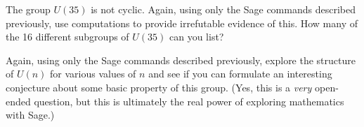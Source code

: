 \begin{sageverbatim}\end{sageverbatim}
%
%
The group $U(35)$ is not cyclic.  Again, using only the Sage commands described previously, use computations to provide irrefutable evidence of this.  How many of the 16 different subgroups of $U(35)$ can you list?\par
\begin{sageverbatim}\end{sageverbatim}
%
%
Again, using only the Sage commands described previously, explore the structure of $U(n)$ for various values of $n$ and see if you can formulate an interesting conjecture about some basic property of this group.  (Yes, this is a {\em very} open-ended question, but this is ultimately the real power of exploring mathematics with Sage.)
\begin{sageverbatim}\end{sageverbatim}
%
